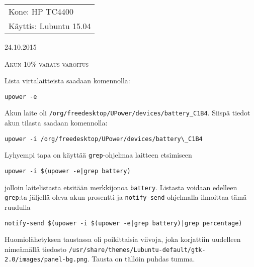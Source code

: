 \documentclass[main.tex]{subfiles}
\begin{document}
\thispagestyle{empty}
\begin{tabular}[t]{l}
Kone: HP TC4400\\
Käyttis: Lubuntu 15.04
\end{tabular}
\hfill 24.10.2015

{\scshape\Large{Akun 10\% varaus varoitus}}

Lista virtalaitteista saadaan komennolla: 

\begin{lstlisting}
upower -e
\end{lstlisting}

Akun laite oli \texttt{/org/freedesktop/UPower/devices/battery\_C1B4}. Siispä tiedot akun tilasta saadaan komennolla:

\begin{lstlisting}
upower -i /org/freedesktop/UPower/devices/battery\_C1B4
\end{lstlisting}

Lyhyempi tapa on käyttää \texttt{grep}-ohjelmaa laitteen etsimiseen

\begin{lstlisting}
upower -i $(upower -e|grep battery)
\end{lstlisting}

jolloin laitelistasta etsitään merkkijonoa \texttt{battery}. Listasta voidaan edelleen \texttt{grep}:ta jäljellä oleva akun prosentti ja \texttt{notify-send}-ohjelmalla ilmoittaa tämä ruudulla

\begin{lstlisting}
notify-send $(upower -i $(upower -e|grep battery)|grep percentage)
\end{lstlisting}

Huomiolähetyksen taustassa oli poikittaisia viivoja, joka korjattiin uudelleen nimeämällä tiedosto \texttt{/usr/share/themes/Lubuntu-default/gtk-2.0/images/panel-bg.png}. Tausta on tällöin puhdas tumma.
\end{document}
